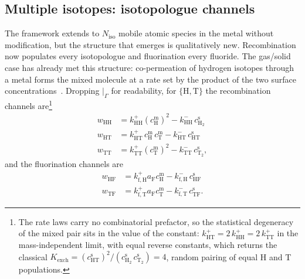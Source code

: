 \documentclass[5p]{elsarticle}
\newcommand{\cm}[1]{c^{\mathrm{m}}_{#1}}   %
\newcommand{\cs}[1]{c^{\mathrm{s}}_{#1}}   %
\begin{document}
\subsection{Multiple isotopes: isotopologue channels}
\label{sec:isotopes}

The framework extends to $N_\mathrm{iso}$ mobile atomic species in the metal without modification, but the structure that emerges is qualitatively new.
Recombination now populates every isotopologue and fluorination every fluoride. 
The gas/solid case has already met this structure: co-permeation of hydrogen isotopes through a metal forms the mixed molecule at a rate set by the product of the two surface concentrations~\cite{zhu_modeling_2024}.
Dropping $\big|_\Gamma$ for readability, for $\{\mathrm{H,T}\}$ the recombination channels are\footnote{The rate laws carry no combinatorial prefactor, so the statistical degeneracy of the mixed pair sits in the value of the constant: $k_{\mathrm{HT}}^{+} = 2\,k_{\mathrm{HH}}^{+} = 2\,k_{\mathrm{TT}}^{+}$ in the mass-independent limit, with equal reverse constants, which returns the classical $K_\mathrm{exch} = (\cs{\mathrm{HT}})^{2} / (\cs{\mathrm{H_2}}\,\cs{\mathrm{T_2}}) = 4$, random pairing of equal H and T populations.}
\begin{align}
    w_{\mathrm{HH}} &= k_{\mathrm{HH}}^{+}\left(\cm{\mathrm{H}}\right)^{2}
                     - k_{\mathrm{HH}}^{-}\,\cs{\mathrm{H_2}}
    \label{eq:iso_HH}\\
    w_{\mathrm{HT}} &= k_{\mathrm{HT}}^{+}\,\cm{\mathrm{H}}\,\cm{\mathrm{T}}
                     - k_{\mathrm{HT}}^{-}\,\cs{\mathrm{HT}}
    \label{eq:iso_HT}\\
    w_{\mathrm{TT}} &= k_{\mathrm{TT}}^{+}\left(\cm{\mathrm{T}}\right)^{2}
                     - k_{\mathrm{TT}}^{-}\,\cs{\mathrm{T_2}},
    \label{eq:iso_TT}
\end{align}
and the fluorination channels are
\begin{align}
    w_{\mathrm{HF}} &= k_{\mathrm{f,H}}^{+} a_{\mathrm{F}} \cm{\mathrm{H}}
                     - k_{\mathrm{f,H}}^{-}\,\cs{\mathrm{HF}}
    \label{eq:iso_HF}\\
    w_{\mathrm{TF}} &= k_{\mathrm{f,T}}^{+} a_{\mathrm{F}} \cm{\mathrm{T}}
                     - k_{\mathrm{f,T}}^{-}\,\cs{\mathrm{TF}} .
    \label{eq:iso_TF}
\end{align}
\end{document}
